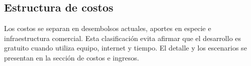 \subsection{Estructura de costos}

Los costos se separan en desembolsos actuales, aportes en especie e infraestructura
comercial. Esta clasificación evita afirmar que el desarrollo es gratuito cuando
utiliza equipo, internet y tiempo. El detalle y los escenarios se presentan en la
sección de costos e ingresos.
